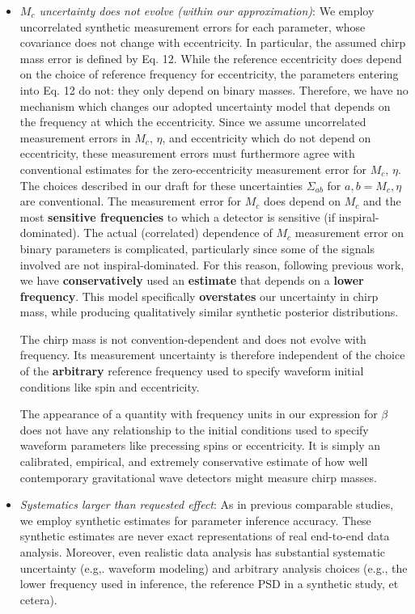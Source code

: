 \documentclass[a4paper]{scrreprt}
\begin{document}
\begin{itemize}

    \item \emph{$M_c$ uncertainty does not evolve (within our approximation)}:
We employ uncorrelated synthetic measurement errors for each parameter, whose covariance does not change with eccentricity.  In particular, the assumed chirp mass error is defined by Eq. 12.  While the reference eccentricity does
depend on the choice of reference frequency for eccentricity, the parameters entering into Eq. 12 do not: they only depend on binary masses. Therefore, we have no mechanism which changes our adopted uncertainty model that depends on the frequency at
which the eccentricity.
Since we assume uncorrelated measurement errors in $M_c$, $\eta$, and eccentricity which do not depend on eccentricity, these measurement errors must furthermore agree with conventional estimates for the zero-eccentricity measurement error
for $M_c$, $\eta$.  The choices described in our draft for these uncertainties $\Sigma_{ab}$ for $a,b ={M_c,\eta}$ are conventional.
The measurement error for $M_c$ does depend on $M_c$ and the most \textbf{sensitive frequencies} to which a detector is
sensitive (if inspiral-dominated). The actual (correlated) dependence of $M_c$ measurement error on binary parameters is
complicated, particularly since some of the signals involved are not inspiral-dominated. For this reason, following
previous work, we have \textbf{conservatively} used an \textbf{estimate} that depends on a \textbf{lower frequency}.  This model specifically
\textbf{overstates} our uncertainty in chirp mass, while producing qualitatively similar synthetic posterior distributions.

The chirp mass is not convention-dependent and does not evolve with frequency.  Its measurement uncertainty is therefore independent of the choice of the \textbf{arbitrary} reference frequency used to specify waveform initial conditions
like spin and eccentricity.   

The appearance of a quantity with frequency units in our expression for $\beta$ does not have any relationship to the
initial conditions used to specify waveform parameters like precessing spins or eccentricity.  It is simply an
calibrated, empirical, and extremely conservative estimate of how well contemporary gravitational wave detectors might measure chirp masses.

    \item \emph{Systematics larger than requested effect}:
As in previous comparable studies, we employ synthetic estimates for parameter inference accuracy.  
These synthetic estimates are never exact representations of real end-to-end data analysis.  Moreover, even realistic data
analysis has substantial systematic uncertainty (e.g,. waveform modeling) and arbitrary analysis choices (e.g., the
lower frequency used in inference, the reference PSD in a synthetic study, et cetera).     


\end{itemize}
\end{document}

